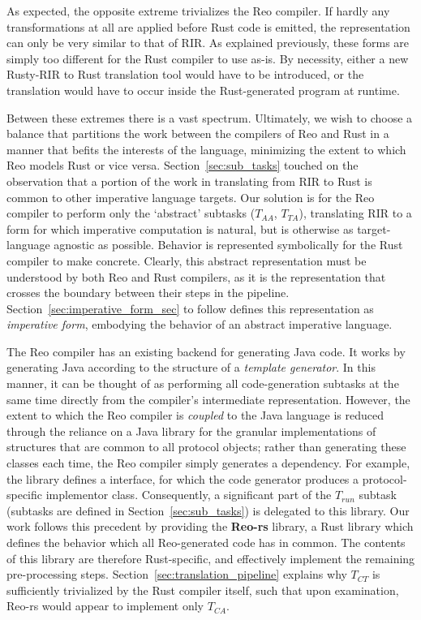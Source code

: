 As expected, the opposite extreme trivializes the Reo compiler. If hardly any transformations at all are applied before Rust code is emitted, the representation can only be very similar to that of RIR. As explained previously, these forms are simply too different for the Rust compiler to use as-is. By necessity, either a new Rusty-RIR to Rust translation tool would have to be introduced, or the translation would have to occur inside the Rust-generated program at runtime.

Between these extremes there is a vast spectrum. Ultimately, we wish to choose a balance that partitions the work between the compilers of Reo and Rust in a manner that befits the interests of the language, minimizing the extent to which Reo models Rust or vice versa. Section~\ref{sec:sub_tasks} touched on the observation that a portion of the work in translating from RIR to Rust is common to other imperative language targets. Our solution is for the Reo compiler to perform only the `abstract' subtasks ($T_{AA}$, $T_{TA}$), translating RIR to a form for which imperative computation is natural, but is otherwise as target-language agnostic as possible. Behavior is represented symbolically for the Rust compiler to make concrete. Clearly, this abstract representation must be understood by both Reo and Rust compilers, as it is the representation that crosses the boundary between their steps in the pipeline. Section~\ref{sec:imperative_form_sec} to follow defines this representation as \textit{imperative form}, embodying the behavior of an abstract imperative language.

The Reo compiler has an existing backend for generating Java code. It works by generating Java according to the structure of a \textit{template generator}. In this manner, it can be thought of as performing all code-generation subtasks at the same time directly from the compiler's intermediate representation. However, the extent to which the Reo compiler is \textit{coupled} to the Java language is reduced through the reliance on a Java library for the granular implementations of structures that are common to all protocol objects; rather than generating these classes each time, the Reo compiler simply generates a dependency. For example, the library defines a  interface, for which the code generator produces a protocol-specific implementor class. Consequently, a significant part of the $T_{run}$ subtask (subtasks are defined in Section~\ref{sec:sub_tasks}) is delegated to this library. Our work follows this precedent by providing the \textbf{Reo-rs} library, a Rust library which defines the behavior which all Reo-generated code has in common. The contents of this library are therefore Rust-specific, and effectively implement the remaining pre-processing steps. Section~\ref{sec:translation_pipeline} explains why $T_{CT}$ is sufficiently trivialized by the Rust compiler itself, such that upon examination, Reo-rs would appear to implement only $T_{CA}$. 


